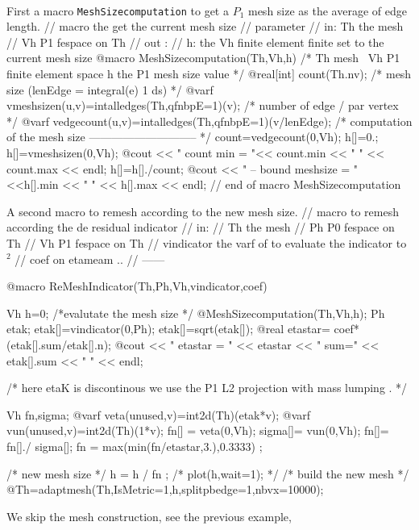 \documentclass[a4paper,twoside,12pt]{book}
\begin{document}
\begin{example}~

First a macro \texttt{MeshSizecomputation} to get a $P_1$  mesh size as the average of edge length.
\bFF
// macro the get the current mesh size \hfilll
// parameter \hfilll
//  in:  Th the mesh\hfilll
//       Vh  P1 fespace on Th\hfilll
//  out : \hfilll
// h: the Vh finite element finite set to the current mesh size \hfilll
@macro  MeshSizecomputation(Th,Vh,h)
{  /* Th mesh \
	 Vh  P1 finite element space
	 h   the P1 mesh size value */
	@real[int]  count(Th.nv);
	/* mesh size  (lenEdge =  integral(e) 1 ds)  */
	@varf vmeshsizen(u,v)=intalledges(Th,qfnbpE=1)(v);
	/* number of edge / par vertex */
	@varf vedgecount(u,v)=intalledges(Th,qfnbpE=1)(v/lenEdge);
   /*
	  computation of the mesh size
	  ----------------------------- */
	count=vedgecount(0,Vh);
	h[]=0.;
	h[]=vmeshsizen(0,Vh);
	@cout << " count min = "<< count.min << " " << count.max << endl;
	h[]=h[]./count;
    @cout << " -- bound meshsize = " <<h[].min << " " << h[].max << endl;
} // end of macro MeshSizecomputation\hfilll
\eFF

A second  macro to remesh  according to the new mesh size.
\bFF
// macro to remesh according the de residual indicator \hfilll
// in: \hfilll
//     Th the mesh\hfilll
//     Ph  P0 fespace on Th\hfilll
//     Vh  P1 fespace on Th\hfilll
//     vindicator the varf of to evaluate the indicator to ${}^2$ \hfilll
//     coef on etameam ..\hfilll
// ------\hfilll

@macro  ReMeshIndicator(Th,Ph,Vh,vindicator,coef)
{
	Vh h=0;
	/*evalutate the mesh size  */
	@MeshSizecomputation(Th,Vh,h);
	Ph etak;
	etak[]=vindicator(0,Ph);
	etak[]=sqrt(etak[]);
	@real etastar= coef*(etak[].sum/etak[].n);
	@cout << " etastar = " << etastar << " sum=" << etak[].sum << " " << endl;

	/* here etaK is discontinous
	   we use the P1 L2 projection with mass lumping . */
	
	Vh fn,sigma;
	@varf veta(unused,v)=int2d(Th)(etak*v);
	@varf vun(unused,v)=int2d(Th)(1*v);
	fn[]  = veta(0,Vh);
	sigma[]= vun(0,Vh);
	fn[]= fn[]./ sigma[];
	fn =  max(min(fn/etastar,3.),0.3333) ;
	
	/* new mesh size */
	h = h / fn ;
	/* plot(h,wait=1); */
	/*  build  the new mesh */
	@Th=adaptmesh(Th,IsMetric=1,h,splitpbedge=1,nbvx=10000);
}
\eFF

We skip the mesh construction, see the previous example,


\end{example}
\end{document}
